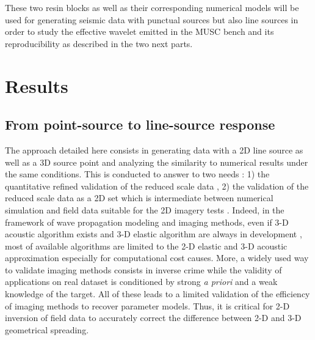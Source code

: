 \documentclass[manuscript,revised]{geophysics}
\newcommand{\twod}{2-D }
\newcommand{\thrd}{3-D }
\begin{document}
\noindent These two resin blocks as well as their corresponding numerical models will be used for generating seismic data with punctual sources but also line sources in order to study the effective wavelet emitted in the MUSC bench and its reproducibility as described in the two next parts.

\section{Results}

\subsection{From point-source to line-source response}


\noindent The approach detailed here consists in generating data with a 2D line source as well as a 3D source point and analyzing the similarity to numerical results under the same conditions. This is conducted to answer to two needs : 1) the quantitative refined validation of the reduced scale data , 2) the validation of the reduced scale data as a 2D set which is intermediate between numerical simulation and field data suitable for the 2D imagery tests . Indeed, in the framework of wave propagation modeling and imaging methods, even if \thrd acoustic algorithm exists \citep{benhadjali_FWI_2008,plessix_FWI_2010} and \thrd elastic algorithm are always in development \citep{castellanos_AMD_2011,Borisov_FWI_2015}, most of available algorithms are limited to the \twod elastic and \thrd acoustic approximation especially for computational cost causes. More, a widely used way to validate imaging methods consists in inverse crime while the validity of applications on real dataset is conditioned by strong \textit{a priori} and a weak knowledge of the target. All of these leads to a limited validation of the efficiency of imaging methods to recover parameter models. Thus, it is critical for \twod inversion of field data to accurately correct the difference between \twod and \thrd geometrical spreading.
\end{document}
